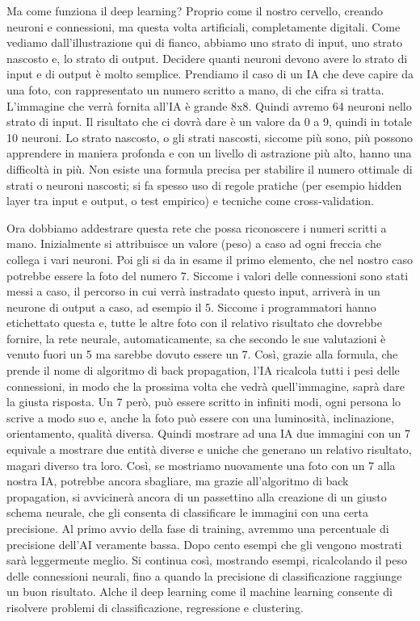 \documentclass[12pt]{book} %
\begin{document}
Ma come funziona il deep learning? Proprio come il nostro cervello, creando neuroni e connessioni, ma questa volta
artificiali, completamente digitali. Come vediamo dall'illustrazione qui di fianco, abbiamo uno
strato di input, uno strato nascosto e, lo strato di output. Decidere quanti neuroni devono avere lo strato di input e
di output è molto semplice. Prendiamo il caso di un IA che deve capire da una foto, con rappresentato un numero scritto
a mano, di che cifra si tratta. L'immagine che verrà fornita all'IA è grande
8x8. Quindi avremo 64 neuroni nello strato di input. Il risultato che ci dovrà dare è un valore da 0 a 9, quindi in
totale 10 neuroni. Lo strato nascosto, o gli strati nascosti, siccome più sono, più possono apprendere in maniera
profonda e con un livello di astrazione più alto, hanno una difficoltà in più. Non esiste una formula precisa per stabilire il numero ottimale di strati o neuroni nascosti; si fa spesso uso di regole pratiche (per esempio hidden layer tra input e output, o test empirico) e tecniche come cross‑validation.

Ora dobbiamo addestrare questa rete che possa riconoscere i numeri scritti a mano. Inizialmente si attribuisce un valore
(peso) a caso ad ogni freccia che collega i vari neuroni. Poi gli si da in esame il primo elemento, che nel nostro caso
potrebbe essere la foto del numero 7. Siccome i valori delle connessioni sono stati messi a caso, il percorso in cui
verrà instradato questo input, arriverà in un neurone di output a caso, ad esempio il 5. Siccome i programmatori hanno
etichettato questa e, tutte le altre foto con il relativo risultato che dovrebbe fornire, la rete neurale,
automaticamente, sa che secondo le sue valutazioni è venuto fuori un 5 ma sarebbe dovuto essere un 7. Così, grazie alla
formula, che prende il nome di algoritmo di back propagation, l'IA ricalcola tutti i pesi delle
connessioni, in modo che la prossima volta che vedrà quell'immagine, saprà dare la giusta
risposta. Un 7 però, può essere scritto in infiniti modi, ogni persona lo scrive a modo suo e, anche la foto può essere
con una luminosità, inclinazione, orientamento, qualità diversa. Quindi mostrare ad una IA due immagini con un 7
equivale a mostrare due entità diverse e uniche che generano un relativo risultato, magari diverso tra loro. Così, se
mostriamo nuovamente una foto con un 7 alla nostra IA, potrebbe ancora sbagliare, ma grazie
all'algoritmo di back propagation, si avvicinerà ancora di un passettino alla creazione di un
giusto schema neurale, che gli consenta di classificare le immagini con una certa precisione. Al primo avvio della fase
di training, avremmo una percentuale di precisione dell'AI veramente bassa. Dopo cento esempi che
gli vengono mostrati sarà leggermente meglio. Si continua così, mostrando esempi, ricalcolando il peso delle
connessioni neurali, fino a quando la precisione di classificazione raggiunge un buon risultato. Alche il deep learning
come il machine learning consente di risolvere problemi di classificazione, regressione e clustering.
\end{document}
